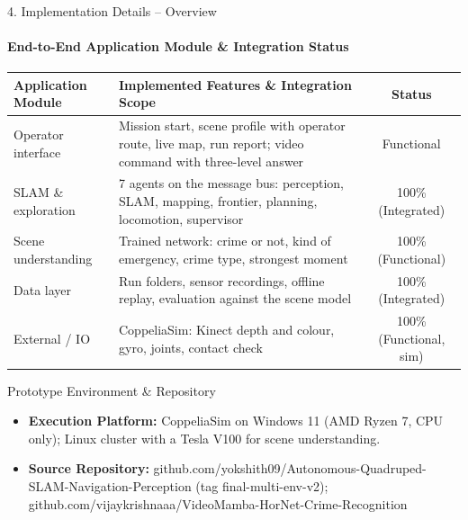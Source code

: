\documentclass[aspectratio=169, 11pt]{beamer}
\begin{document}
\begin{frame}{4. Implementation Details -- Overview}
    \framesubtitle{End-to-End Application Module \& Integration Status}
    \begin{table}
        \centering
        \scriptsize
        \renewcommand{\arraystretch}{1.2}
        \begin{tabular}{p{3.4cm} p{7.4cm} c}
            \toprule
            \textbf{Application Module} & \textbf{Implemented Features \& Integration Scope} & \textbf{Status} \\
            \midrule
            Operator interface & Mission start, scene profile with operator route, live map, run report; video command with three-level answer & Functional \\
            SLAM \& exploration & 7 agents on the message bus: perception, SLAM, mapping, frontier, planning, locomotion, supervisor & 100\% (Integrated) \\
            Scene understanding & Trained network: crime or not, kind of emergency, crime type, strongest moment & 100\% (Functional) \\
            Data layer & Run folders, sensor recordings, offline replay, evaluation against the scene model & 100\% (Integrated) \\
            External / IO & CoppeliaSim: Kinect depth and colour, gyro, joints, contact check & 100\% (Functional, sim) \\
            \bottomrule
        \end{tabular}
    \end{table}

    \begin{block}{Prototype Environment \& Repository}
        \footnotesize
        \begin{itemize}
            \item \textbf{Execution Platform:} CoppeliaSim on Windows 11 (AMD Ryzen 7, CPU only); Linux cluster with a Tesla V100 for scene understanding.
            \item \textbf{Source Repository:} github.com/yokshith09/Autonomous-Quadruped-SLAM-Navigation-Perception (tag final-multi-env-v2); github.com/vijaykrishnaaa/VideoMamba-HorNet-Crime-Recognition
        \end{itemize}
    \end{block}
\end{frame}
\end{document}

